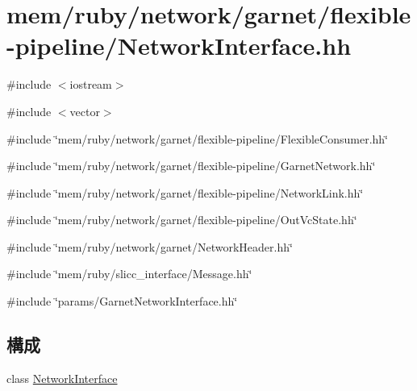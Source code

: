 \hypertarget{NetworkInterface_8hh}{
\section{mem/ruby/network/garnet/flexible-\/pipeline/NetworkInterface.hh}
\label{NetworkInterface_8hh}
}
{\ttfamily \#include $<$iostream$>$}\par
{\ttfamily \#include $<$vector$>$}\par
{\ttfamily \#include \char`\"{}mem/ruby/network/garnet/flexible-\/pipeline/FlexibleConsumer.hh\char`\"{}}\par
{\ttfamily \#include \char`\"{}mem/ruby/network/garnet/flexible-\/pipeline/GarnetNetwork.hh\char`\"{}}\par
{\ttfamily \#include \char`\"{}mem/ruby/network/garnet/flexible-\/pipeline/NetworkLink.hh\char`\"{}}\par
{\ttfamily \#include \char`\"{}mem/ruby/network/garnet/flexible-\/pipeline/OutVcState.hh\char`\"{}}\par
{\ttfamily \#include \char`\"{}mem/ruby/network/garnet/NetworkHeader.hh\char`\"{}}\par
{\ttfamily \#include \char`\"{}mem/ruby/slicc\_\-interface/Message.hh\char`\"{}}\par
{\ttfamily \#include \char`\"{}params/GarnetNetworkInterface.hh\char`\"{}}\par
\subsection*{構成}
\begin{DoxyCompactItemize}
\item 
class \hyperlink{classNetworkInterface}{NetworkInterface}
\end{DoxyCompactItemize}
